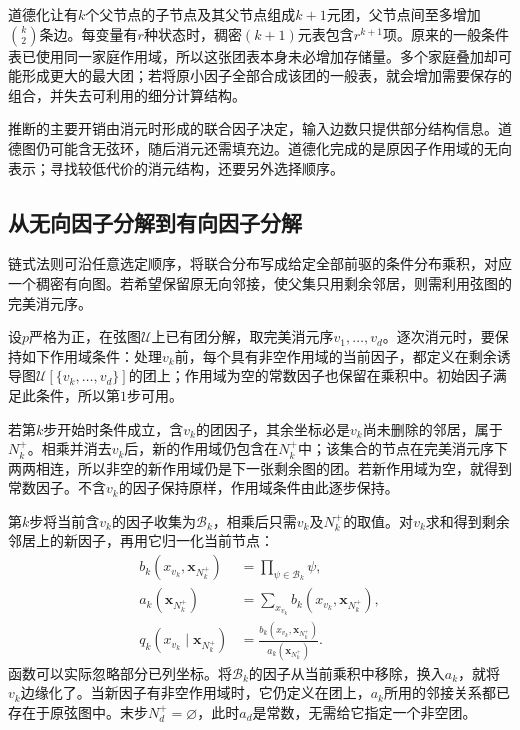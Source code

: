 道德化让有$k$个父节点的子节点及其父节点组成$k+1$元团，父节点间至多增加$\binom{k}{2}$条边。每变量有$r$种状态时，稠密$(k+1)$元表包含$r^{k+1}$项。原来的一般条件表已使用同一家庭作用域，所以这张团表本身未必增加存储量。多个家庭叠加却可能形成更大的最大团；若将原小因子全部合成该团的一般表，就会增加需要保存的组合，并失去可利用的细分计算结构。

推断的主要开销由消元时形成的联合因子决定，输入边数只提供部分结构信息。道德图仍可能含无弦环，随后消元还需填充边。道德化完成的是原因子作用域的无向表示；寻找较低代价的消元结构，还要另外选择顺序。

\subsection{从无向因子分解到有向因子分解}
\label{sec:pgm-representations-undirected-to-directed}

链式法则可沿任意选定顺序，将联合分布写成给定全部前驱的条件分布乘积，对应一个稠密有向图。若希望保留原无向邻接，使父集只用剩余邻居，则需利用弦图的完美消元序。

设$p$严格为正，在弦图$\mathcal{U}$上已有团分解，取完美消元序$v_1,\ldots,v_d$。逐次消元时，要保持如下作用域条件：处理$v_k$前，每个具有非空作用域的当前因子，都定义在剩余诱导图$\mathcal{U}[\{v_k,\ldots,v_d\}]$的团上；作用域为空的常数因子也保留在乘积中。初始因子满足此条件，所以第$1$步可用。

若第$k$步开始时条件成立，含$v_k$的团因子，其余坐标必是$v_k$尚未删除的邻居，属于$N_k^+$。相乘并消去$v_k$后，新的作用域仍包含在$N_k^+$中；该集合的节点在完美消元序下两两相连，所以非空的新作用域仍是下一张剩余图的团。若新作用域为空，就得到常数因子。不含$v_k$的因子保持原样，作用域条件由此逐步保持。

第$k$步将当前含$v_k$的因子收集为$\mathcal{B}_k$，相乘后只需$v_k$及$N_k^+$的取值。对$v_k$求和得到剩余邻居上的新因子，再用它归一化当前节点：
\begin{equation}
  \begin{aligned}
    b_k(x_{v_k},\bm{x}_{N_k^+})
    &=\prod_{\psi\in\mathcal{B}_k}\psi,\\
    a_k(\bm{x}_{N_k^+})
    &=\sum_{x_{v_k}}b_k(x_{v_k},\bm{x}_{N_k^+}),\\
    q_k(x_{v_k}\mid\bm{x}_{N_k^+})
    &=\frac{b_k(x_{v_k},\bm{x}_{N_k^+})}
    {a_k(\bm{x}_{N_k^+})}.
  \end{aligned}
  \label{eq:pgm-representations-bucket-normalization}
\end{equation}
函数可以实际忽略部分已列坐标。将$\mathcal{B}_k$的因子从当前乘积中移除，换入$a_k$，就将$v_k$边缘化了。当新因子有非空作用域时，它仍定义在团上，$a_k$所用的邻接关系都已存在于原弦图中。末步$N_d^+=\varnothing$，此时$a_d$是常数，无需给它指定一个非空团。

